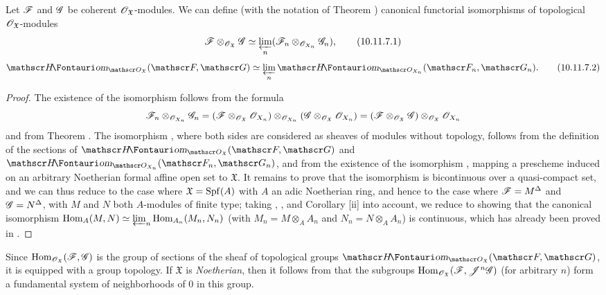 \begin{proposition}[10.11.7]
\label{1.10.11.7}
Let $\mathscr{F}$ and $\mathscr{G}$ be coherent $\mathscr{O}_\mathfrak{X}$-modules.
We can define (with the notation of Theorem ) canonical functorial isomorphisms of topological $\mathscr{O}_\mathfrak{X}$-modules 
\[
\label{1.10.11.7.1}
  \mathscr{F}\otimes_{\mathscr{O}_\mathfrak{X}}\mathscr{G}\simeq\varprojlim_n(\mathscr{F}_n\otimes_{\mathscr{O}_{X_n}}\mathscr{G}_n),
  \tag{10.11.7.1}
\]
\[
\label{1.10.11.7.2}
  \shHom_{\sh{O}_\mathfrak{X}}(\sh{F},\sh{G})\isoto\varprojlim_n\shHom_{\sh{O}_{X_n}}(\sh{F}_n,\sh{G}_n).
  \tag{10.11.7.2}
\]
\end{proposition}

\begin{proof}
\label{proof-1.10.11.7}
The existence of the isomorphism  follows from the formula
\[
  \mathscr{F}_n\otimes_{\mathscr{O}_{X_n}}\mathscr{G}_n=(\mathscr{F}\otimes_{\mathscr{O}_\mathfrak{X}}\mathscr{O}_{X_n})\otimes_{\mathscr{O}_{X_n}}(\mathscr{G}\otimes_{\mathscr{O}_\mathfrak{X}}\mathscr{O}_{X_n})=(\mathscr{F}\otimes_{\mathscr{O}_\mathfrak{X}}\mathscr{G})\otimes_{\mathscr{O}_\mathfrak{X}}\mathscr{O}_{X_n}
\]
and from Theorem .
The isomorphism , where both sides are considered as sheaves of modules without topology, follows from the definition of the sections of $\shHom_{\sh{O}_\mathfrak{X}}(\sh{F},\sh{G})$ and $\shHom_{\sh{O}_{X_n}}(\sh{F}_n,\sh{G}_n)$, and from the existence of the isomorphism , mapping a prescheme induced on an arbitrary Noetherian formal affine open set to $\mathfrak{X}$.
It remains to prove that the isomorphism  is bicontinuous over a quasi-compact set, and we can thus reduce to the case where $\mathfrak{X}=\operatorname{Spf}(A)$ with $A$ an adic Noetherian ring, and hence  to the case where $\mathscr{F}=M^\Delta$ and $\mathscr{G}=N^\Delta$, with $M$ and $N$ both $A$-modules of finite type; taking , , and Corollary [ii] into account, we reduce to showing that the canonical isomorphism $\operatorname{Hom}_A(M,N)\simeq\varprojlim_n\operatorname{Hom}_{A_n}(M_n,N_n)$ (with $M_n=M\otimes_A A_n$ and $N_n=N\otimes_A A_n$) is continuous, which has already been proved in .
\end{proof}

\begin{env}[10.11.8]
\label{1.10.11.8}
Since $\operatorname{Hom}_{\mathscr{O}_\mathfrak{X}}(\mathscr{F},\mathscr{G})$ is the group of sections of the sheaf of topological groups $\shHom_{\sh{O}_\mathfrak{X}}(\sh{F},\sh{G})$, it is equipped with a group topology.
If $\mathfrak{X}$ is \emph{Noetherian}, then it follows from  that the subgroups $\operatorname{Hom}_{\mathscr{O}_\mathfrak{X}}(\mathscr{F},\mathscr{J}^n\mathscr{G})$ (for arbitrary $n$) form a fundamental system of neighborhoods of $0$ in this group.
\end{env}

